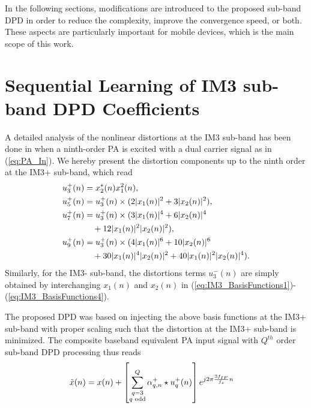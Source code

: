 In the following sections, modifications are introduced to the proposed sub-band DPD in order to reduce the complexity, improve the convergence speed, or both. These aspects are particularly important for mobile devices, which is the main scope of this work.

\section{Sequential Learning of IM3 sub-band DPD Coefficients}
\label{sec:Sequential_Learning}
A detailed analysis of the nonlinear distortions at the IM3 sub-band has been done in \cite{TMTT_SubbandDPD} when a ninth-order PA is excited with a dual carrier signal as in (\ref{eq:PA_In}). We hereby present the distortion components up to the ninth order at the IM3+ sub-band, which read
\begin{align}
\small
u^+_3(n) &= x_2^*(n)x_1^2(n), \label{eq:IM3_BasisFunctions1}\\
u^+_5(n) &= u^+_3(n) \times (2 |x_1(n)|^2 + 3 |x_2(n)|^2),  \label{eq:IM3_BasisFunctions2}\\
u^+_7(n) &= u^+_3(n) \times (3 |x_1(n)|^4 + 6 |x_2(n)|^4 \nonumber\\
& \quad + 12 |x_1(n)|^2 |x_2(n)|^2) \label{eq:IM3_BasisFunctions3},\\
u^+_9(n) &= u^+_3(n) \times (4 |x_1(n)|^6 + 10|x_2(n)|^6 \nonumber\\
&\quad + 30 |x_1(n)|^4 |x_2(n)|^2 + 40 |x_1(n)|^2 |x_2(n)|^4). \label{eq:IM3_BasisFunctions4}
\end{align}
\normalsize
Similarly, for the IM3- sub-band, the distortions terms $u^-_3(n)$ are simply obtained by interchanging $x_1(n)$ and $x_2(n)$ in (\ref{eq:IM3_BasisFunctions1})-(\ref{eq:IM3_BasisFunctions4}).

The proposed DPD was based on injecting the above basis functions at the IM3+ sub-band with proper scaling such that the distortion at the IM3+ sub-band is minimized. The composite baseband equivalent PA input signal with $Q^{th}$ order sub-band DPD processing thus reads 
\begin{align}
\small
\tilde{x}(n) &=  x(n) + \left[\sum_{\substack{q=3 \\ q \text{ odd}}}^{Q} \alpha^+_{q,n} \star  u^+_q(n)\right]e^{j 2\pi \frac{3 f_{IF}}{f_s} n}
\label{eq:PA_In_with_IM3_DPD}
\end{align}
\normalsize

